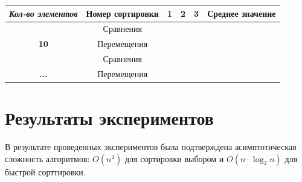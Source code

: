 \documentclass[a4paper,11pt]{article}
\begin{document}
    \begin{table}[H]
        \begin{tabular}{|c|c|l|l|l|l|}
        \hline
        \textit{\textbf{Кол-во элементов}}                    & \textbf{Номер сортировки} & \multicolumn{1}{c|}{\textbf{1}} & \multicolumn{1}{c|}{\textbf{2}} & \multicolumn{1}{c|}{\textbf{3}} & \multicolumn{1}{c|}{\textbf{Среднее значение}} \\ \hline
        {\color[HTML]{3F3B42} }                               & Сравнения                 &                                 &                                 &                                 &                                                \\ \cline{2-6} 
        \multirow{-2}{*}{{\color[HTML]{3F3B42} \textbf{10}}}  & Перемещения               &                                 &                                 &                                 &                                                \\ \hline
        {\color[HTML]{3F3B42} }                               & Сравнения                 &                                 &                                 &                                 &                                                \\ \cline{2-6} 
        \multirow{-2}{*}{{\color[HTML]{3F3B42} \textbf{...}}} & Перемещения               &                                 &                                 &                                 &                                                \\ \hline
        \end{tabular}
    \end{table}

    \newpage
    \section{Результаты экспериментов}
    \vspace{0.3cm}
    В результате проведенных экспериментов была подтверждена асимптотическая сложность алгоритмов:
    $O(n^2)$ для сортировки выбором и $O(n\cdot\log_2n)$ для быстрой сорттировки. 
\end{document}
